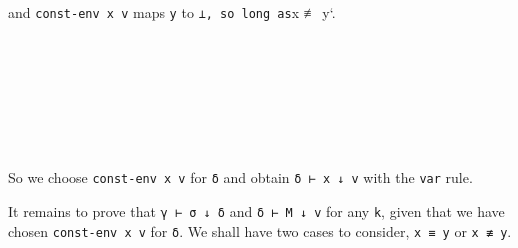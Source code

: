and \texttt{const-env\ x\ v} maps \texttt{y} to
\texttt{⊥,\ so\ long\ as}x ≢ y`.

\begin{fence}
\begin{code}%
\>[0]\AgdaSpace{}%
\AgdaSymbol{:}\AgdaSpace{}%
\AgdaSymbol{\}}\AgdaSpace{}%
\AgdaSymbol{\{}\AgdaSpace{}%
\AgdaSpace{}%
\AgdaSymbol{:}\AgdaSpace{}%
\AgdaSpace{}%
\AgdaSpace{}%
\AgdaSymbol{\}}\AgdaSpace{}%
\AgdaSymbol{\{}\AgdaSymbol{\}}\<%
\\
\>[0][@{}l@{\AgdaIndent{0}}]%
\>[2]%
\>[821I]\AgdaSpace{}%
\AgdaSpace{}%
\<%
\\
\>[.][@{}l@{}]\<[821I]%
\>[4]\AgdaComment{-------------------}\<%
\\
%
\>[2]\AgdaSpace{}%
\AgdaSpace{}%
\AgdaSpace{}%
\AgdaSpace{}%
\AgdaSpace{}%
\AgdaSpace{}%
\<%
\\
\>[0]\AgdaSpace{}%
\AgdaSymbol{\{}\AgdaSymbol{\}}\AgdaSpace{}%
\AgdaSymbol{\{}\AgdaSymbol{\}}\AgdaSpace{}%
\AgdaSymbol{\{}\AgdaSymbol{\}}\AgdaSpace{}%
\AgdaSpace{}%
\AgdaSpace{}%
\AgdaSpace{}%
\AgdaSpace{}%
\<%
\\
\>[0]%
\>[5]\AgdaSymbol{|}\AgdaSpace{}%
\AgdaSpace{}%
%
\>[15]\AgdaSymbol{=}%
\>[18]\AgdaSpace{}%
\AgdaSymbol{(}\AgdaSpace{}%
\AgdaSymbol{)}\<%
\\
\>[0]%
\>[5]\AgdaSymbol{|}\AgdaSpace{}%
\AgdaSpace{}%
\AgdaSymbol{\AgdaUnderscore{}}%
\>[15]\AgdaSymbol{=}%
\>[18]\<%
\end{code}
\end{fence}

So we choose \texttt{const-env\ x\ v} for \texttt{δ} and obtain
\texttt{δ\ ⊢\ x\ ↓\ v} with the \texttt{var} rule.

It remains to prove that \texttt{γ\ ⊢\ σ\ ↓\ δ} and
\texttt{δ\ ⊢\ M\ ↓\ v} for any \texttt{k}, given that we have chosen
\texttt{const-env\ x\ v} for \texttt{δ}. We shall have two cases to
consider, \texttt{x\ ≡\ y} or \texttt{x\ ≢\ y}.

